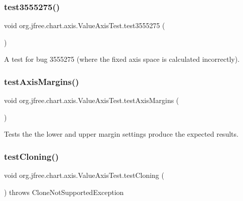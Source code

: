 \subsubsection{\texorpdfstring{test3555275()}{test3555275()}}
{\footnotesize\ttfamily void org.\+jfree.\+chart.\+axis.\+Value\+Axis\+Test.\+test3555275 (\begin{DoxyParamCaption}{ }\end{DoxyParamCaption})}

A test for bug 3555275 (where the fixed axis space is calculated incorrectly). \mbox{\label{classorg_1_1jfree_1_1chart_1_1axis_1_1_value_axis_test_aecc99febb2b06f39cb5856cc347b0049}} 
\subsubsection{\texorpdfstring{test\+Axis\+Margins()}{testAxisMargins()}}
{\footnotesize\ttfamily void org.\+jfree.\+chart.\+axis.\+Value\+Axis\+Test.\+test\+Axis\+Margins (\begin{DoxyParamCaption}{ }\end{DoxyParamCaption})}

Tests the the lower and upper margin settings produce the expected results. \mbox{\label{classorg_1_1jfree_1_1chart_1_1axis_1_1_value_axis_test_ab0b133a873d573747114fde80502e825}} 
\subsubsection{\texorpdfstring{test\+Cloning()}{testCloning()}}
{\footnotesize\ttfamily void org.\+jfree.\+chart.\+axis.\+Value\+Axis\+Test.\+test\+Cloning (\begin{DoxyParamCaption}{ }\end{DoxyParamCaption}) throws Clone\+Not\+Supported\+Exception}

